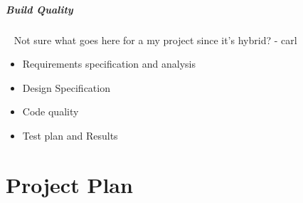 \subparagraph{Build Quality}~
Not sure what goes here for a my project since it's hybrid? 
\todo - carl
\begin{itemize}
	\item Requirements specification and analysis
	\item Design Specification 
	\item Code quality
	\item Test plan and Results
\end{itemize}

\clearpage

\section{Project Plan}
\noindent
{}
